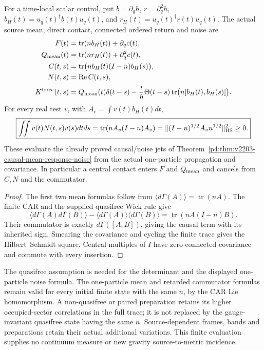 \documentclass[12pt,a4paper]{article}
\begin{document}
\begin{proposition}
\label{p3f:prop:v247-car-source-jets}
For a time-local scalar control, put
$b=\partial_qh$, $r=\partial_q^2h$,
$b_H(t)=u_q(t)^\dagger b(t)u_q(t)$, and
$r_H(t)=u_q(t)^\dagger r(t)u_q(t)$.
The actual source mean, direct contact, connected ordered return and
noise are
\begin{align*}
 F(t)&=\operatorname{tr}(n b_H(t))+\partial_qc(t),\\
 Q_{\rm mean}(t)&=\operatorname{tr}(n r_H(t))+\partial_q^2c(t),\\
 C(t,s)&=\operatorname{tr}\bigl(n b_H(t)(I-n)b_H(s)\bigr),\\
 N(t,s)&=\operatorname{Re}C(t,s),\\
 K^{\rm force}(t,s)&=Q_{\rm mean}(t)\delta(t-s)
 -\frac{i}{\hbar}\Theta(t-s)
        \operatorname{tr}\bigl(n[b_H(t),b_H(s)]\bigr).
\end{align*}
For every real test $v$, with $A_v=\int v(t)b_H(t)dt$,
\[
 \boxed{\iint v(t)N(t,s)v(s)dtds
 =\operatorname{tr}(n A_v(I-n)A_v)
 =\|(I-n)^{1/2}A_v n^{1/2}\|_{\rm HS}^2\ge0.}
\]
These evaluate the already proved causal/noise jets of
Theorem~\ref{p4:thm:v2203-causal-mean-response-noise} from the actual
one-particle propagation and covariance. In particular a central contact
enters $F$ and $Q_{\rm mean}$ and cancels from $C,N$ and the commutator.
\end{proposition}
\begin{proof}
The first two mean formulas follow from
$\langle d\Gamma(A)\rangle=\operatorname{tr}(nA)$.
The finite CAR and the supplied quasifree Wick rule give
\[
 \langle d\Gamma(A)d\Gamma(B)\rangle
 -\langle d\Gamma(A)\rangle\langle d\Gamma(B)\rangle
 =\operatorname{tr}(nA(I-n)B).
\]
Their commutator is exactly $d\Gamma([A,B])$, giving the causal term
with its inherited sign. Smearing the covariance and cycling the finite
trace gives the Hilbert--Schmidt square. Central multiples of $I$ have
zero connected covariance and commute with every insertion.
\end{proof}

The quasifree assumption is needed for the determinant and the displayed
one-particle noise formula. The one-particle mean and retarded commutator
formulas remain valid for every initial finite state with the same $n$,
by the CAR Lie homomorphism. A non-quasifree or paired preparation retains
its higher occupied-sector correlations in the full trace; it is not
replaced by the gauge-invariant quasifree state having the same $n$.
Source-dependent frames, bands and preparations retain their actual
additional variations. This finite evaluation supplies no continuum
measure or new gravity source-to-metric incidence.
\end{document}

